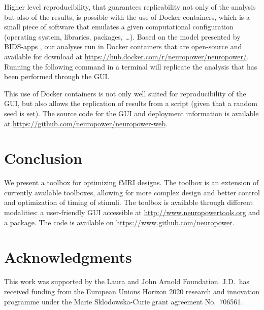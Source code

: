 \documentclass[article]{jss}
\begin{document}
Higher level reproducibility, that guarantees replicability not only
of the analysis but also of the results, is possible with the use of
Docker containers, which is a small piece of software that emulates a
given computational configuration (operating system, libraries,
 packages, \ldots).  Based on the model presented by
BIDS-apps \citep{Gorgolewski2016-wg}, our analyses run in Docker
containers that are open-source and available for download at
\url{https://hub.docker.com/r/neuropower/neuropower/}.  Running the
following command in a terminal will replicate the analysis that has
been performed through the GUI.
\begin{CodeChunk}
\end{CodeChunk}
%
This use of Docker containers is not only well suited for
reproducibility of the GUI, but also allows the replication of results
from a \proglang{Python} script (given that a random seed is set). The
source code for the GUI and deployment information is available at
\url{https://github.com/neuropower/neuropower-web}.

\section{Conclusion}\label{sec:conclusion}

We present a toolbox for optimizing fMRI designs.  The toolbox is an
extension of currently available toolboxes, allowing for more complex
design and better control and optimization of timing of stimuli.  The
toolbox is available through different modalities: a user-friendly GUI
accessible at \url{http://www.neuropowertools.org} and a
 package.  The code is available on
\url{https://www.github.com/neuropower}.

\section*{Acknowledgments}

This work was supported by the Laura and John Arnold Foundation.
J.D.\ has received funding from the European Unions Horizon 2020
research and innovation programme under the Marie Sklodowska-Curie
grant agreement No.~706561.


\end{document}

